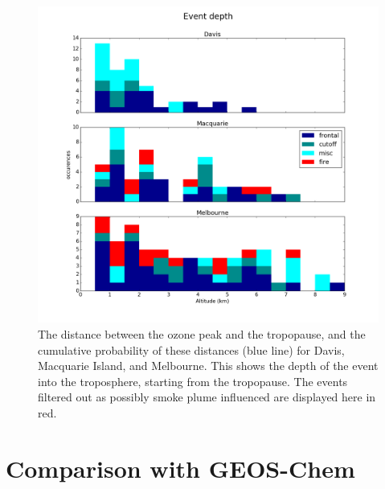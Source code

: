 \documentclass{article}
\begin{document}
  \begin{figure}[!htbp]
    \begin{center}
    \includegraphics[width=0.99\columnwidth]{figures/summary_depth.png}
    \caption{The distance between the ozone peak and the tropopause, and the cumulative probability of these distances (blue line) for Davis, Macquarie Island, and Melbourne.
    This shows the depth of the event into the troposphere, starting from the tropopause.
    The events filtered out as possibly smoke plume influenced are displayed here in red.}
    \label{fig:SummaryTPDepths}
    \end{center}
  \end{figure}

\section{Comparison with GEOS-Chem}
  
\end{document}
